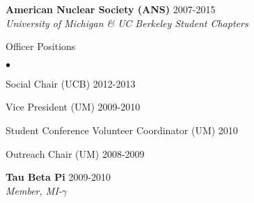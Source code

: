 \documentclass[margin,line]{res}
\newenvironment{list1}{
  \begin{list}{\ding{113}}{%
      \setlength{\itemsep}{0in}
      \setlength{\parsep}{0in} \setlength{\parskip}{0in}
      \setlength{\topsep}{0in} \setlength{\partopsep}{0in} 
      \setlength{\leftmargin}{0.17in}}}{\end{list}}
\newenvironment{list2}{
  \begin{list}{$\bullet$}{%
      \setlength{\itemsep}{0in}
      \setlength{\parsep}{0in} \setlength{\parskip}{0in}
      \setlength{\topsep}{0in} \setlength{\partopsep}{0in} 
      \setlength{\leftmargin}{0.2in}}}{\end{list}}
\begin{document}
\begin{resume}
{\bf American Nuclear Society (ANS)} \hfill 2007-2015 \\
{\em University of Michigan \& UC Berkeley Student Chapters} 

\begin{list1}
  \item[] Officer Positions
  \begin{list2}
    \item Social Chair (UCB) \hfill 2012-2013
    \item Vice President (UM) \hfill 2009-2010
    \item Student Conference Volunteer Coordinator (UM) \hfill 2010
    \item Outreach Chair (UM) \hfill 2008-2009
  \end{list2}
\end{list1}

{\bf Tau Beta Pi} \hfill 2009-2010 \\
{\em Member, MI-$\gamma$} 

%

\end{resume}
\end{document}
